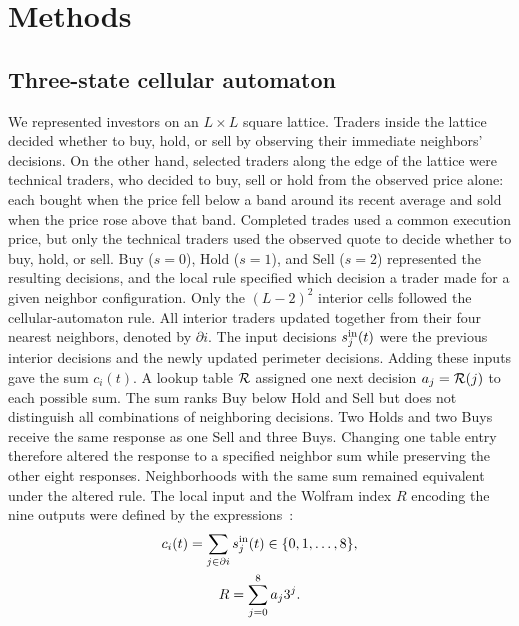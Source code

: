 \section{Methods}

\subsection{Three-state cellular automaton}

We represented investors on an $L\times L$ square lattice. Traders
inside the lattice decided whether to buy, hold,
or sell by observing their immediate neighbors' decisions. On the other hand, selected traders
along the edge of the lattice were technical traders, who decided to buy, sell or hold
from the observed price alone:
each bought when the price fell below a band around its recent average and
sold when the price rose above that band. Completed trades used a common
execution price, but only the technical traders used the observed quote to
decide whether to buy, hold, or sell. Buy ($s=0$), Hold ($s=1$), and Sell
($s=2$) represented the resulting decisions, and the local rule specified
which decision a trader made for a given neighbor configuration. Only the $(L-2)^2$ interior
cells followed the cellular-automaton rule. All interior traders updated together from their four nearest
neighbors, denoted by $\partial i$. The input decisions $s_j^{\rm in}(t)$
were the previous interior decisions and the newly updated perimeter
decisions. Adding these inputs gave the sum $c_i(t)$. A lookup table ${\cal R}$ assigned
one next decision $a_j={\cal R}(j)$ to each possible sum.
The sum ranks Buy below Hold and Sell but does not distinguish all
combinations of neighboring decisions. Two Holds and two
Buys receive the same response as one Sell and three Buys.
Changing one table entry therefore altered the response to a specified
neighbor sum while preserving the other eight responses. Neighborhoods
with the same sum remained equivalent under the altered rule.
The local input and the Wolfram index $R$ encoding the nine
outputs were defined by the expressions~\cite{wolfram1984universality,packard1985two}:
\begin{gather}
  c_i(t)=\sum_{j\in\partial i}s_j^{\rm in}(t)\in\{0,1,\ldots,8\},
  \label{eq:neighborhood-sum}\\
  R=\sum_{j=0}^{8}a_j3^j.
  \label{eq:rule-index}
\end{gather}

